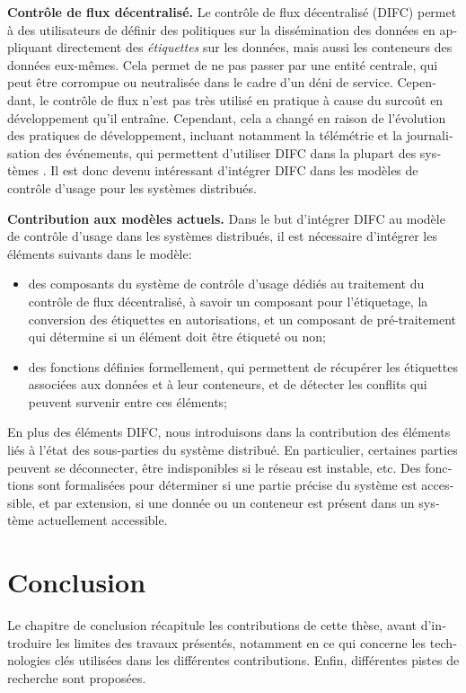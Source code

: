 \begin{otherlanguage}{french}
\textbf{Contrôle de flux décentralisé.} Le contrôle de flux décentralisé (DIFC) \cite{Myers1997} permet à des utilisateurs de définir des politiques sur la dissémination des données en appliquant directement des \emph{étiquettes} sur les données, mais aussi les conteneurs des données eux-mêmes. Cela permet de ne pas passer par une entité centrale, qui peut être corrompue ou neutralisée dans le cadre d'un déni de service. Cependant, le contrôle de flux n'est pas très utilisé en pratique à cause du surcoût en développement qu'il entraîne. Cependant, cela a changé en raison de l'évolution des pratiques de développement, incluant notamment la télémétrie et la journalisation des événements, qui permettent d'utiliser DIFC dans la plupart des systèmes \cite{Liu2022}. Il est donc devenu intéressant d'intégrer DIFC dans les modèles de contrôle d'usage pour les systèmes distribués.

\textbf{Contribution aux modèles actuels.} Dans le but d'intégrer DIFC au modèle de contrôle d'usage dans les systèmes distribués, il est nécessaire d'intégrer les éléments suivants dans le modèle:

\begin{itemize}
    \item des composants du système de contrôle d'usage dédiés au traitement du contrôle de flux décentralisé, à savoir un composant pour l'étiquetage, la conversion des étiquettes en autorisations, et un composant de pré-traitement qui détermine si un élément doit être étiqueté ou non;
    \item des fonctions définies formellement, qui permettent de récupérer les étiquettes associées aux données et à leur conteneurs, et de détecter les conflits qui peuvent survenir entre ces éléments;
\end{itemize}

En plus des éléments DIFC, nous introduisons dans la contribution des éléments liés à l'état des sous-parties du système distribué. En particulier, certaines parties peuvent se déconnecter, être indisponibles si le réseau est instable, etc. Des fonctions sont formalisées pour déterminer si une partie précise du système est accessible, et par extension, si une donnée ou un conteneur est présent dans un système actuellement accessible.

\section*{Conclusion}

Le chapitre de conclusion récapitule les contributions de cette thèse, avant d'introduire les limites des travaux présentés, notamment en ce qui concerne les technologies clés utilisées dans les différentes contributions. Enfin, différentes pistes de recherche sont proposées.


\end{otherlanguage}
